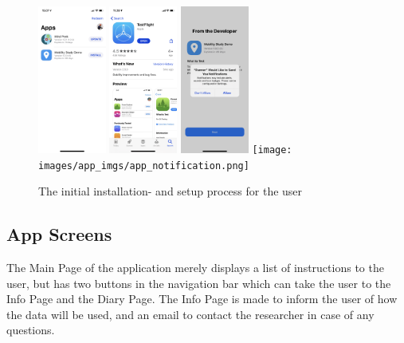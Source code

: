 \begin{figure}
    \centering
    \includegraphics[width=0.2\textwidth]{images/app_imgs/app_testflight.png} \includegraphics[width=0.2\textwidth]{images/app_imgs/app-appstore.png}
    \includegraphics[width=0.2\textwidth]{images/app_imgs/app_permission.png} \texttt{[image: images/app\_imgs/app\_notification.png]}
    \caption{The initial installation- and setup process for the user}
    \label{fig:my_label}
\end{figure}

\subsection{App Screens}
The Main Page of the application merely displays a list of instructions to the user, but has two buttons in the navigation bar which can take the user to the Info Page and the Diary Page. The Info Page is made to inform the user of how the data will be used, and an email to contact the researcher in case of any questions.

